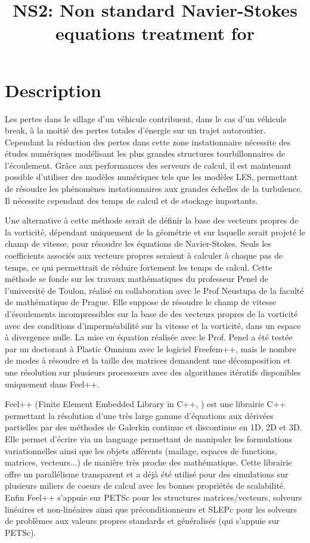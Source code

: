 \documentclass{article}
\title{NS2: Non standard Navier-Stokes equations treatment for }
\begin{document}
\maketitle

\abstract{

}

\section{Description}
\label{sec:description}

Les pertes dans le sillage d’un véhicule contribuent, dans le cas d’un véhicule
break, à la moitié des pertes totales d’énergie sur un trajet
autoroutier. Cependant la réduction des pertes dans cette zone instationnaire
nécessite des études numériques modélisant les plus grandes structures
tourbillonnaires de l’écoulement. Grâce aux performances des serveurs de calcul,
il est maintenant possible d’utiliser des modèles numériques tels que les
modèles LES, permettant de résoudre les phénomènes instationnaires aux grandes
échelles de la turbulence. Il nécessite cependant des temps de calcul et de
stockage importants.

Une alternative à cette méthode serait de définir la base des vecteurs propres
de la vorticité, dépendant uniquement de la géométrie et sur laquelle serait
projeté le champ de vitesse, pour résoudre les équations de Navier-Stokes. Seuls
les coefficients associés aux vecteurs propres seraient à calculer à chaque pas
de temps, ce qui permettrait de réduire fortement les temps de calcul. Cette
méthode se fonde sur les travaux mathématiques du professeur Penel de
l’université de Toulon, réalisé en collaboration avec le Prof Neustupa de la
faculté de mathématique de Prague. Elle suppose de résoudre le champ de vitesse
d’écoulements incompressibles sur la base de des vecteurs propres de la
vorticité avec des conditions d’imperméabilité sur la vitesse et la vorticité,
dans un espace à divergence nulle. La mise en équation réalisée avec le
Prof. Penel a été testée par un doctorant à Plastic Omnium avec le logiciel
Freefem++, mais le nombre de modes à résoudre et la taille des matrices
demandent une décomposition et une résolution sur plusieurs processeurs avec des
algorithmes itératifs disponibles uniquement dans Feel++.

Feel++ (Finite Element Embedded Library in C++, \cite{} ) est une librairie C++
permettant la résolution d'une très large gamme d'équations aux dérivées
partielles par des méthodes de Galerkin continue et discontinue en 1D, 2D et
3D. Elle permet d'écrire via un language permettant de manipuler les
formulations variationnelles ainsi que les objets afférents (mailage, espaces de
functions, matrices, vecteurs...) de manière très proche des mathématique. Cette
librairie offre un parallélisme transparent et a déjà été utilisé pour des
simulations sur plusieurs miliers de coeurs de calcul avec les bonnes propriétés
de scalabilité. Enfin Feel++ s'appuie sur PETSc pour les structures
matrices/vecteurs, solveurs linéaires et non-linéaires ainsi que
préconditionneurs et SLEPc pour les solveurs de problèmes aux valeurs propres
standards et généralisés (qui s'appuie sur PETSc).
\end{document}
